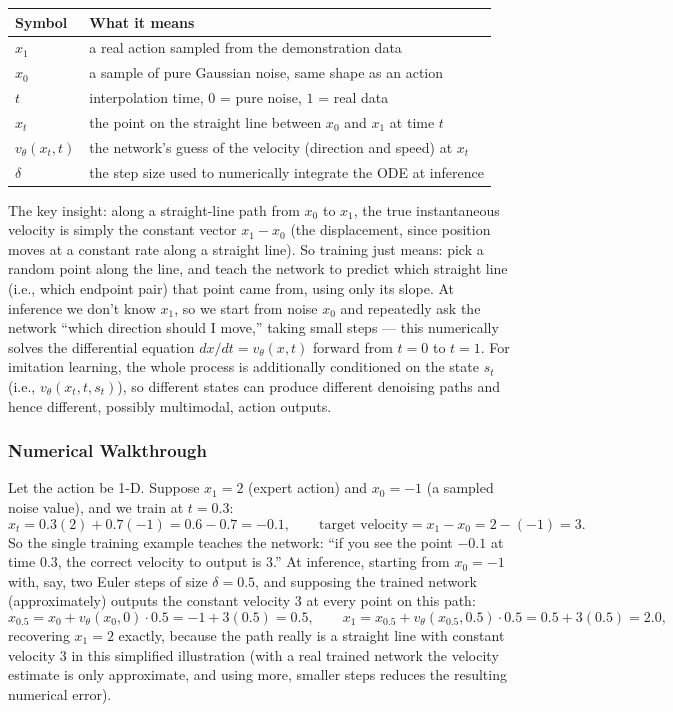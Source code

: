 \begin{center}
\begin{tabular}{@{}ll@{}}
\toprule
Symbol & What it means \\
\midrule
$x_1$ & a real action sampled from the demonstration data \\
$x_0$ & a sample of pure Gaussian noise, same shape as an action \\
$t$ & interpolation time, $0$ = pure noise, $1$ = real data \\
$x_t$ & the point on the straight line between $x_0$ and $x_1$ at time $t$ \\
$v_\theta(x_t,t)$ & the network's guess of the velocity (direction and speed) at $x_t$ \\
$\delta$ & the step size used to numerically integrate the ODE at inference \\
\bottomrule
\end{tabular}
\end{center}

The key insight: along a straight-line path from $x_0$ to $x_1$, the true instantaneous velocity is simply the constant vector $x_1 - x_0$ (the displacement, since position moves at a constant rate along a straight line). So training just means: pick a random point along the line, and teach the network to predict which straight line (i.e., which endpoint pair) that point came from, using only its slope. At inference we don't know $x_1$, so we start from noise $x_0$ and repeatedly ask the network ``which direction should I move,'' taking small steps --- this numerically solves the differential equation $dx/dt = v_\theta(x,t)$ forward from $t=0$ to $t=1$. For imitation learning, the whole process is additionally conditioned on the state $s_t$ (i.e., $v_\theta(x_t,t,s_t)$), so different states can produce different denoising paths and hence different, possibly multimodal, action outputs.

\subsubsection*{Numerical Walkthrough}

Let the action be 1-D. Suppose $x_1 = 2$ (expert action) and $x_0 = -1$ (a sampled noise value), and we train at $t=0.3$:
\[
x_t = 0.3(2) + 0.7(-1) = 0.6 - 0.7 = -0.1, \qquad \text{target velocity} = x_1 - x_0 = 2-(-1) = 3.
\]
So the single training example teaches the network: ``if you see the point $-0.1$ at time $0.3$, the correct velocity to output is $3$.'' At inference, starting from $x_0=-1$ with, say, two Euler steps of size $\delta=0.5$, and supposing the trained network (approximately) outputs the constant velocity $3$ at every point on this path:
\[
x_{0.5} = x_0 + v_\theta(x_0,0)\cdot 0.5 = -1 + 3(0.5) = 0.5, \qquad
x_{1} = x_{0.5} + v_\theta(x_{0.5},0.5)\cdot 0.5 = 0.5 + 3(0.5) = 2.0,
\]
recovering $x_1=2$ exactly, because the path really is a straight line with constant velocity $3$ in this simplified illustration (with a real trained network the velocity estimate is only approximate, and using more, smaller steps reduces the resulting numerical error).
